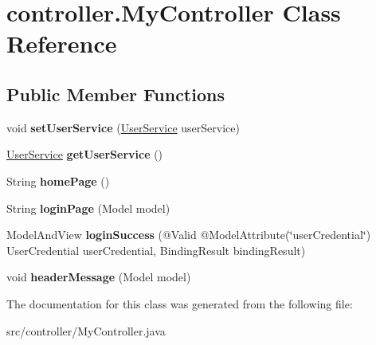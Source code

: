 \hypertarget{classcontroller_1_1_my_controller}{}\section{controller.\+My\+Controller Class Reference}
\label{classcontroller_1_1_my_controller}
\subsection*{Public Member Functions}
\begin{DoxyCompactItemize}
\item 
\mbox{\label{classcontroller_1_1_my_controller_ab4548b3ff61fde48613d33bda4aa7584}} 
void {\bfseries set\+User\+Service} (\mbox{\hyperlink{interfaceservice_1_1_user_service}{User\+Service}} user\+Service)
\item 
\mbox{\label{classcontroller_1_1_my_controller_acb0d7ce51bc67218aaa0836fb7ba39fe}} 
\mbox{\hyperlink{interfaceservice_1_1_user_service}{User\+Service}} {\bfseries get\+User\+Service} ()
\item 
\mbox{\label{classcontroller_1_1_my_controller_a61cacf62d1577ebd748fcba3bc3317f1}} 
String {\bfseries home\+Page} ()
\item 
\mbox{\label{classcontroller_1_1_my_controller_af21c7c2ccb1b888de29c076fd0f8e7d1}} 
String {\bfseries login\+Page} (Model model)
\item 
\mbox{\label{classcontroller_1_1_my_controller_aaf9f00246183e423f2e8b53cc9882e74}} 
Model\+And\+View {\bfseries login\+Success} (@Valid @Model\+Attribute(\char`\"{}user\+Credential\char`\"{}) User\+Credential user\+Credential, Binding\+Result binding\+Result)
\item 
\mbox{\label{classcontroller_1_1_my_controller_aad33f4776dfe62f8728ec601d5d4bc19}} 
void {\bfseries header\+Message} (Model model)
\end{DoxyCompactItemize}


The documentation for this class was generated from the following file\+:\begin{DoxyCompactItemize}
\item 
src/controller/My\+Controller.\+java\end{DoxyCompactItemize}
